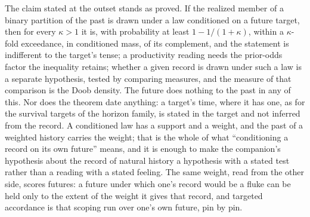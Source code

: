 The claim stated at the outset stands as proved. If the realized member
of a binary partition of the past is drawn under a law conditioned on a
future target, then for every $\kappa>1$ it is, with probability at least
$1-1/(1+\kappa)$, within a $\kappa$-fold exceedance, in conditioned mass, of its complement, and the statement is indifferent to the target's tense; a productivity reading needs the prior-odds factor the inequality retains; whether a given record is drawn under such a law is a
separate hypothesis, tested by comparing measures, and the measure of
that comparison is the Doob density. The future does nothing to the past
in any of this. Nor does the theorem date anything: a target's time, where it has one, as for the survival targets of the horizon family, is stated in the target and not inferred from the record. A conditioned law has a support and a weight, and the
past of a weighted history carries the weight; that is the whole of what
``conditioning a record on its own future'' means, and it is enough to
make the companion's hypothesis about the record of natural history a
hypothesis with a stated test rather than a reading with a stated
feeling. The same weight, read from the other side, scores futures: a
future under which one's record would be a fluke can be held only to the
extent of the weight it gives that record, and targeted accordance is
that scoping run over one's own future, pin by pin.

\printbibliography
